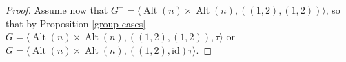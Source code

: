 \documentclass[11pt]{amsart}
\makeatletter
\gdef\gsetlength#1#2{%
  \begingroup
    \setlength\skip@{#2}%
    \global#1=\skip@    %
  \endgroup             %
}
\newcommand{\deflen}[2]{%
  \@ifundefined{#1}{\prefix@deflen{#1}{#2}}{\prefix@setlen{#1}{#2}}
}
\newcommand{\prefix@deflen}[2]{%
  \expandafter\newlength\csname #1\endcsname
  \expandafter\setlength\csname #1\endcsname{#2}%
}
\newcommand{\prefix@setlen}[2]{%
  \expandafter\setlength\csname #1\endcsname{#2}%
}
\newcommand*{\drawNodes}[1][]{%
    \begingroup
    \pgfkeys{/cbNodes, #1}%
    \newcommand*{\Nodes}[1]{\pgfkeysvalueof{/cbNodes/##1}}
    
    \foreach \j in {1,2}{
        \ifthenelse{\j=1}{%
            \def\s{v}
            \deflen{y}{0pt}
            \def\partLabel{delta}
            \def\partName{\Delta}
        }{%
            \def\s{u}
            \deflen{y}{-\partshift}
            \def\partLabel{deltaPrime}
            \def\partName{\Delta'}
        }
        \deflen{x}{0pt}
        \foreach \i in {1,...,\Nodes{nrFirst}}{
            \node [anchor=west, item] at (\x, \y) (\s_\i) {${\s}_{\i}$};
            \getnodedimen{\s_\i}
            \gsetlength{\x}{\dimexpr \x + \nodewidth + \itemshift \relax};
        }
        \node [anchor=west, item] at (\x, \y) (\s_dots) {$\cdots$};
        \getnodedimen{\s_dots}
        \gsetlength{\x}{\dimexpr \x + \nodewidth + \itemshift \relax};
        \foreach \i in {1,...,\Nodes{nrLast}}{
            \pgfmathtruncatemacro\k{\Nodes{nrLast} - \i}
            \ifthenelse{\k=0}{%
                \def\suf{n}
                \def\ind{n}
            }{%
                \def\suf{nMinus{\k}}
                \def\ind{n - \k}
            }
            \node [anchor=west, item] at (\x, \y) (\s_\suf) {${\s}_{\ind}$};
            \getnodedimen{\s_\suf}
            \gsetlength{\x}{\dimexpr \x + \nodewidth + \itemshift \relax};
        }
        \node (\partLabel) [block, fit = (\s_1) (\s_1) (\s_1) (\s_n)] {};
        \node [right=\partLabelShift of \partLabel] {$\partName$};
    }

    \endgroup
}
\DeclareMathOperator{\Alt}{Alt}
\makeatother
\begin{document}
\begin{proof}

Assume now that $G^+=\langle \Alt(n)\times \Alt(n),((1,2),(1,2))\rangle$, so that by  Proposition \ref{group-cases} $G=\langle \Alt(n)\times \Alt(n),((1,2),(1,2)),\tau\rangle$ or $G=\langle \Alt(n)\times \Alt(n),((1,2),\mathrm{id})\tau\rangle$.


\end{proof}
\end{document}
